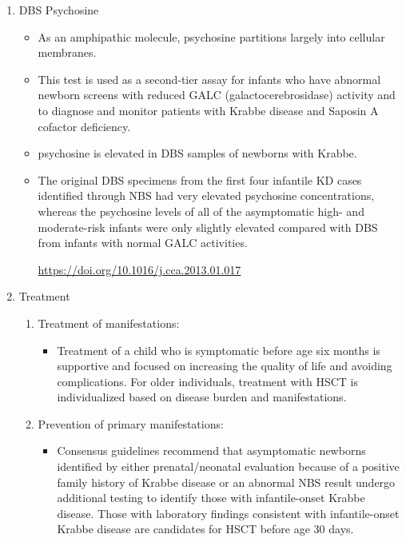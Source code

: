 \documentclass{scrartcl}
\begin{document}
\begin{enumerate}
\begin{enumerate}
\item DBS Psychosine
\label{sec:org34c1822}
\begin{itemize}
\item As an amphipathic molecule, psychosine partitions largely into
cellular membranes.
\item This test is used as a second-tier assay for infants who have
abnormal newborn screens with reduced GALC (galactocerebrosidase)
activity and to diagnose and monitor patients with Krabbe disease
and Saposin A cofactor deficiency.

\item psychosine is elevated in DBS samples of newborns with Krabbe.

\item The original DBS specimens from the first four infantile
KD cases identified through NBS had very elevated psychosine
concentrations, whereas the psychosine levels of all of the
asymptomatic high- and moderate-risk infants were only slightly
elevated compared with DBS from infants with normal GALC activities.

\url{https://doi.org/10.1016/j.cca.2013.01.017}
\end{itemize}


\item Treatment
\label{sec:orgdeafafb}

\begin{enumerate}
\item Treatment of manifestations:
\label{sec:org6665a67}
\begin{itemize}
\item Treatment of a child who is symptomatic before age six months is
supportive and focused on increasing the quality of life and
avoiding complications. For older individuals, treatment with HSCT
is individualized based on disease burden and manifestations.
\end{itemize}

\item Prevention of primary manifestations:
\label{sec:orgf49b371}
\begin{itemize}
\item Consensus guidelines recommend that asymptomatic newborns
identified by either prenatal/neonatal evaluation because of a
positive family history of Krabbe disease or an abnormal NBS
result undergo additional testing to identify those with
infantile-onset Krabbe disease. Those with laboratory findings
consistent with infantile-onset Krabbe disease are candidates for
HSCT before age 30 days.
\end{itemize}


\end{enumerate}
\end{enumerate}
\end{enumerate}
\end{document}
